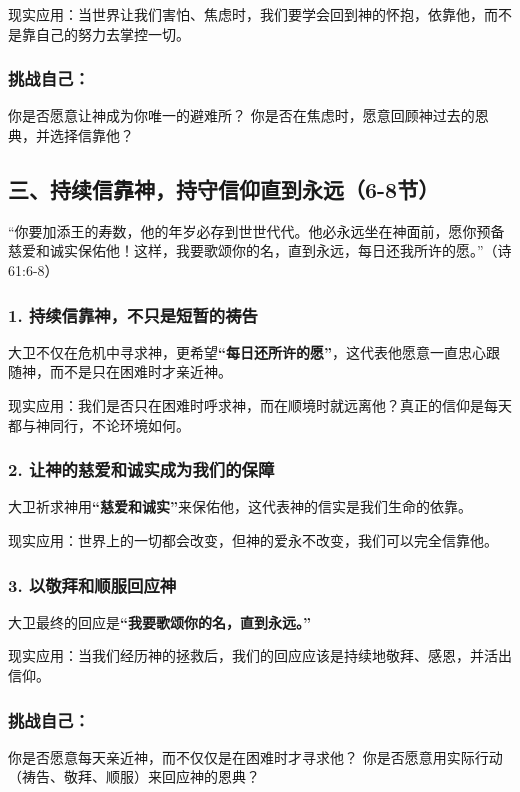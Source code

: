 \documentclass[a4paper, 12pt]{article}
\begin{document}
现实应用：当世界让我们害怕、焦虑时，我们要学会回到神的怀抱，依靠他，而不是靠自己的努力去掌控一切。
\subsubsection*{挑战自己：}
你是否愿意让神成为你唯一的避难所？
你是否在焦虑时，愿意回顾神过去的恩典，并选择信靠他？
\subsection*{三、持续信靠神，持守信仰直到永远（6-8节）}
“你要加添王的寿数，他的年岁必存到世世代代。他必永远坐在神面前，愿你预备慈爱和诚实保佑他！这样，我要歌颂你的名，直到永远，每日还我所许的愿。”（诗 61:6-8）

\subsubsection*{1. 持续信靠神，不只是短暂的祷告}

\hspace{0.6cm}大卫不仅在危机中寻求神，更希望\textbf{“每日还所许的愿”}，这代表他愿意一直忠心跟随神，而不是只在困难时才亲近神。

现实应用：我们是否只在困难时呼求神，而在顺境时就远离他？真正的信仰是每天都与神同行，不论环境如何。
\subsubsection*{2. 让神的慈爱和诚实成为我们的保障}
\hspace{0.6cm}大卫祈求神用\textbf{“慈爱和诚实”}来保佑他，这代表神的信实是我们生命的依靠。

现实应用：世界上的一切都会改变，但神的爱永不改变，我们可以完全信靠他。
\subsubsection*{3. 以敬拜和顺服回应神}
\hspace{0.6cm}大卫最终的回应是\textbf{“我要歌颂你的名，直到永远。”}

现实应用：当我们经历神的拯救后，我们的回应应该是持续地敬拜、感恩，并活出信仰。
\subsubsection*{挑战自己：}
你是否愿意每天亲近神，而不仅仅是在困难时才寻求他？
你是否愿意用实际行动（祷告、敬拜、顺服）来回应神的恩典？
\end{document}
